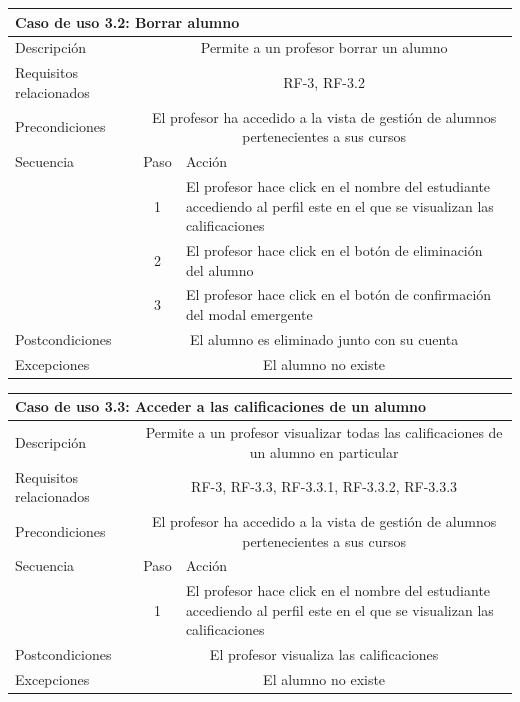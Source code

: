 \begin{adjustwidth}{-2cm}{}
\begin{tabular}[H]{l c l}
\toprule 
\multicolumn{3}{l}{\textbf{Caso de uso 3.2: Borrar alumno}}\\
\midrule
Descripción & \multicolumn{2}{p{10cm}}{Permite a un profesor borrar un alumno}\\
\midrule
Requisitos relacionados & \multicolumn{2}{p{10cm}}{RF-3, RF-3.2}\\
\midrule
Precondiciones & \multicolumn{2}{p{10cm}}{El profesor ha accedido a la vista de gestión de alumnos pertenecientes a sus cursos}\\
\midrule
Secuencia & Paso & Acción \\
\cmidrule{2-3}
         & 1 &  \multicolumn{1}{p{8cm}}{El profesor hace click en el nombre del estudiante accediendo al perfil este en el que se visualizan las calificaciones}\\
         & 2 &  \multicolumn{1}{p{8cm}}{El profesor hace click en el botón de eliminación del alumno}\\
         & 3 &  \multicolumn{1}{p{8cm}}{El profesor hace click en el botón de confirmación del modal emergente}\\

\midrule
Postcondiciones & \multicolumn{2}{p{10cm}}{El alumno es eliminado junto con su cuenta}\\
\midrule
Excepciones & \multicolumn{2}{p{10cm}}{El alumno no existe}\\
\bottomrule 
\end{tabular}

\hspace{3cm}

\begin{tabular}[H]{l c l}
\toprule 
\multicolumn{3}{l}{\textbf{Caso de uso 3.3: Acceder a las calificaciones de un alumno}}\\
\midrule
Descripción & \multicolumn{2}{p{10cm}}{Permite a un profesor visualizar todas las calificaciones de un alumno en particular}\\
\midrule
Requisitos relacionados & \multicolumn{2}{p{10cm}}{RF-3, RF-3.3, RF-3.3.1, RF-3.3.2,  RF-3.3.3}\\
\midrule
Precondiciones & \multicolumn{2}{p{10cm}}{El profesor ha accedido a la vista de gestión de alumnos pertenecientes a sus cursos}\\
\midrule
Secuencia & Paso & Acción \\
\cmidrule{2-3}
         & 1 &  \multicolumn{1}{p{8cm}}{El profesor hace click en el nombre del estudiante accediendo al perfil este en el que se visualizan las calificaciones}\\

\midrule
Postcondiciones & \multicolumn{2}{p{10cm}}{El profesor visualiza las calificaciones}\\
\midrule
Excepciones & \multicolumn{2}{p{10cm}}{El alumno no existe}\\
\bottomrule 
\end{tabular}
\end{adjustwidth}



